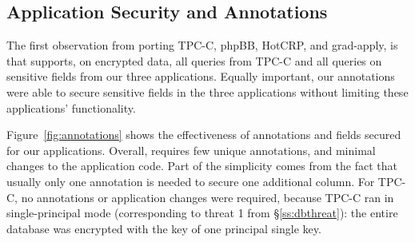 


\subsection{Application Security and Annotations}

The first observation from porting TPC-C, phpBB, HotCRP, and grad-apply, is that \name{} supports, on encrypted data, all queries from TPC-C and all queries on sensitive fields from our three applications. Equally important, our annotations were able to secure sensitive fields in the three applications without limiting these applications' functionality. 

Figure~\ref{fig:annotations} shows the effectiveness of annotations
and fields secured for our applications.  Overall, \name requires few
unique annotations, and minimal changes to the application code.  Part of
the simplicity comes from the fact that usually only one annotation is
needed to secure one additional column.  For TPC-C, no annotations or
application changes were required, because TPC-C ran in single-principal
mode (corresponding to threat 1 from \S\ref{ss:dbthreat}): the entire
database was encrypted with the key of one principal single key.


